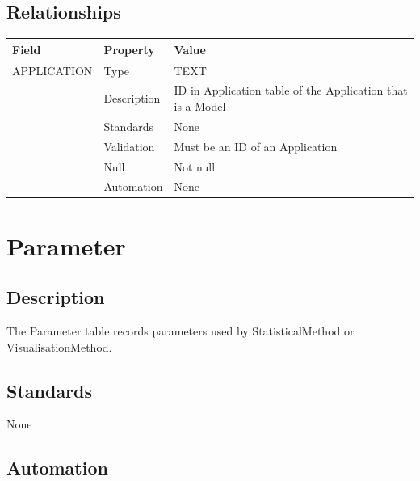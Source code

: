 \subsection{Relationships}\label{relationships-16}

\begin{longtable}[]{@{}
  >{\raggedright\arraybackslash}p{}
  >{\raggedright\arraybackslash}p{}
  >{\raggedright\arraybackslash}p{}@{}}
\toprule\noalign{}
\begin{minipage}[b]{\linewidth}\raggedright
Field
\end{minipage} & \begin{minipage}[b]{\linewidth}\raggedright
Property
\end{minipage} & \begin{minipage}[b]{\linewidth}\raggedright
Value
\end{minipage} \\
\midrule\noalign{}
\endhead
\bottomrule\noalign{}
\endlastfoot
APPLICATION & Type & TEXT \\
& Description & ID in Application table of the Application that is a
Model \\
& Standards & None \\
& Validation & Must be an ID of an Application \\
& Null & Not null \\
& Automation & None \\
\end{longtable}

\section{Parameter}\label{parameter}

\subsection{Description}\label{description-19}

The Parameter table records parameters used by StatisticalMethod or
VisualisationMethod.

\subsection{Standards}\label{standards-21}

None

\subsection{Automation}\label{automation-21}

